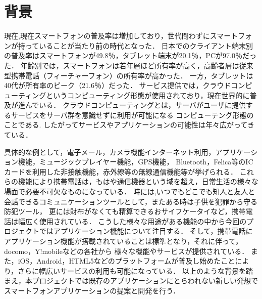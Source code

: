 \section{背景}
\par 
現在,現在スマートフォンの普及率は増加しており，世代問わずにスマートフォンが持っていることが当たり前の時代となった．
日本でのクライアント端末別の普及率はスマートフォンが49.8％，タブレット端末が20.1％，PCが97.0％だった．
年齢別では，スマートフォンは若年層ほど所有率が高く，高齢者層は従来型携帯電話（フィーチャーフォン）の所有率が高かった．
一方，タブレットは40代が所有率のピーク（21.6％）だった．
サービス提供では，クラウドコンピューティングというコンピューティング形態が使用されており，現在世界的に普及が進んでいる．
クラウドコンピューティングとは，サーバがユーザに提供するサービスをサーバ群を意識せずに利用が可能になる
コンピューテング形態のことである.
したがってサービスやアプリケーションの可能性は年々広がってきている．
\par
具体的な例として，電子メール，カメラ機能インターネット利用，アプリケーション機能，ミュージックプレイヤー機能，GPS機能，
Bluetooth，Felica等のICカードを利用した非接触機能，赤外線等の無線通信機能等が挙げられる．
これらの機能により携帯電話は，もはや通信機器という域を超え，日常生活の様々な場面で必要不可欠なものになっている．
時には,いつでもどこでも知人と友人と会話できるコミュニケーションツールとして，またある時は子供を犯罪から守る防犯ツール，
更には財布がなくても精算できるおサイフケータイなど，携帯電話は幅広く使用されている．
こうした様々な用途がある機能の中から今回のプロジェクトではアプリケーション機能について注目する．
そして，携帯電話にアプリケーション機能が搭載されていることは標準となり，それに伴って，docomo，Y!mobileなどの各社から
様々な機能やサービスが提供されている．
また，iOS，Android，HTML5などのプラットフォームが普及し始めたことにより，さらに幅広いサービスの利用も可能になっている．
以上のような背景を踏まえ，本プロジェクトでは既存のアプリケーションにとらわれない新しい発想で
スマートフォンアプリケーションの提案と開発を行う．
